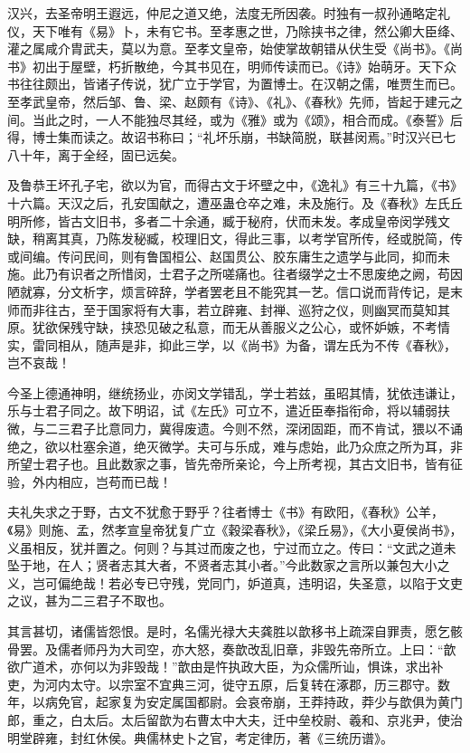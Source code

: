 \documentclass[]{article}
\begin{document}
汉兴，去圣帝明王遐远，仲尼之道又绝，法度无所因袭。时独有一叔孙通略定礼仪，天下唯有《易》卜，未有它书。至孝惠之世，乃除挟书之律，然公卿大臣绛、灌之属咸介胄武夫，莫以为意。至孝文皇帝，始使掌故朝错从伏生受《尚书》。《尚书》初出于屋壁，朽折散绝，今其书见在，明师传读而已。《诗》始萌牙。天下众书往往颇出，皆诸子传说，犹广立于学官，为置博士。在汉朝之儒，唯贾生而已。至孝武皇帝，然后邹、鲁、梁、赵颇有《诗》、《礼》、《春秋》先师，皆起于建元之间。当此之时，一人不能独尽其经，或为《雅》或为《颂》，相合而成。《泰誓》后得，博士集而读之。故诏书称曰；``礼坏乐崩，书缺简脱，联甚闵焉。''时汉兴已七八十年，离于全经，固已远矣。

及鲁恭王坏孔子宅，欲以为官，而得古文于坏壁之中，《逸礼》有三十九篇，《书》十六篇。天汉之后，孔安国献之，遭巫蛊仓卒之难，未及施行。及《春秋》左氏丘明所修，皆古文旧书，多者二十余通，臧于秘府，伏而未发。孝成皇帝闵学残文缺，稍离其真，乃陈发秘臧，校理旧文，得此三事，以考学官所传，经或脱简，传或间编。传问民间，则有鲁国桓公、赵国贯公、胶东庸生之遗学与此同，抑而未施。此乃有识者之所惜闵，士君子之所嗟痛也。往者缀学之士不思废绝之阙，苟因陋就寡，分文析字，烦言碎辞，学者罢老且不能究其一艺。信口说而背传记，是末师而非往古，至于国家将有大事，若立辟雍、封禅、巡狩之仪，则幽冥而莫知其原。犹欲保残守缺，挟恐见破之私意，而无从善服义之公心，或怀妒嫉，不考情实，雷同相从，随声是非，抑此三学，以《尚书》为备，谓左氏为不传《春秋》，岂不哀哉！

今圣上德通神明，继统扬业，亦闵文学错乱，学士若兹，虽昭其情，犹依违谦让，乐与士君子同之。故下明诏，试《左氏》可立不，遣近臣奉指衔命，将以辅弱扶微，与二三君子比意同力，冀得废遗。今则不然，深闭固距，而不肯试，猥以不诵绝之，欲以杜塞余道，绝灭微学。夫可与乐成，难与虑始，此乃众庶之所为耳，非所望士君子也。且此数家之事，皆先帝所亲论，今上所考视，其古文旧书，皆有征验，外内相应，岂苟而已哉！

夫礼失求之于野，古文不犹愈于野乎？往者博士《书》有欧阳，《春秋》公羊，《易》则施、孟，然孝宣皇帝犹复广立《穀梁春秋》，《梁丘易》，《大小夏侯尚书》，义虽相反，犹并置之。何则？与其过而废之也，宁过而立之。传曰：``文武之道未坠于地，在人；贤者志其大者，不贤者志其小者。''今此数家之言所以兼包大小之义，岂可偏绝哉！若必专已守残，党同门，妒道真，违明诏，失圣意，以陷于文吏之议，甚为二三君子不取也。

其言甚切，诸儒皆怨恨。是时，名儒光禄大夫龚胜以歆移书上疏深自罪责，愿乞骸骨罢。及儒者师丹为大司空，亦大怒，奏歆改乱旧章，非毁先帝所立。上曰：``歆欲广道术，亦何以为非毁哉！''歆由是忤执政大臣，为众儒所讪，惧诛，求出补吏，为河内太守。以宗室不宜典三河，徙守五原，后复转在涿郡，历三郡守。数年，以病免官，起家复为安定属国都尉。会哀帝崩，王莽持政，莽少与歆俱为黄门郎，重之，白太后。太后留歆为右曹太中大夫，迁中垒校尉、羲和、京兆尹，使治明堂辟雍，封红休侯。典儒林史卜之官，考定律历，著《三统历谱》。
\end{document}
